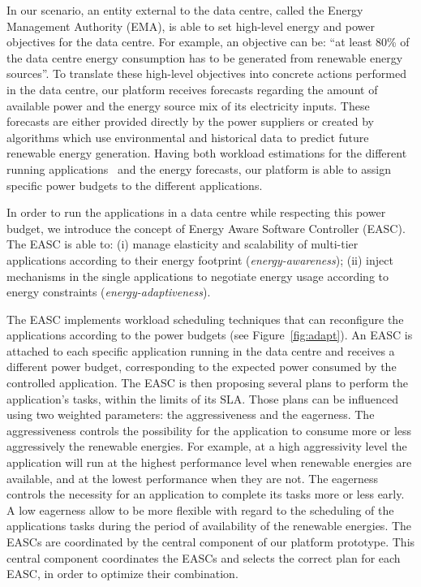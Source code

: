 \documentclass[conference]{IEEEtran}
\begin{document}
In our scenario, an entity external to the data centre, called the Energy Management Authority (EMA), is able to set high-level energy and power objectives for the data centre.
For example, an objective can be: \enquote{at least 80\% of the data centre energy consumption has to be generated from renewable energy sources}.
To translate these high-level objectives into concrete actions performed in the data centre, our platform receives forecasts regarding the amount of available power and the energy source mix of its electricity inputs.
These forecasts are either provided directly by the power suppliers or created by algorithms which use environmental and historical data to predict future renewable energy generation.
Having both workload estimations for the different running applications~\cite{Kansal2008} and the energy forecasts, our platform is able to assign specific power budgets to the different applications.

In order to run the applications in a data centre while respecting this power budget, we introduce the concept of Energy Aware Software Controller (EASC).
The EASC is able to: (i) manage elasticity and scalability of multi-tier applications according to their energy footprint (\emph{energy-awareness}); (ii) inject mechanisms in the single applications to negotiate energy usage according to energy constraints (\emph{energy-adaptiveness}).

The EASC implements workload scheduling techniques that can reconfigure the applications according to the power budgets (see Figure~\ref{fig:adapt}).
An EASC is attached to each specific application running in the data centre and receives a different power budget, corresponding to the expected power consumed by the controlled application.
The EASC is then proposing several plans to perform the application's tasks, within the limits of its SLA.
Those plans can be influenced using two weighted parameters: the aggressiveness and the eagerness.
The aggressiveness controls the possibility for the application to consume more or less aggressively the renewable energies.
For example, at a high aggressivity level the application will run at the highest performance level when renewable energies are available, and at the lowest performance when they are not.
The eagerness controls the necessity for an application to complete its tasks more or less early.
A low eagerness allow to be more flexible with regard to the scheduling of the applications tasks during the period of availability of the renewable energies.
The EASCs are coordinated by the central component of our platform prototype.
This central component coordinates the EASCs and selects the correct plan for each EASC, in order to optimize their combination.
\end{document}
